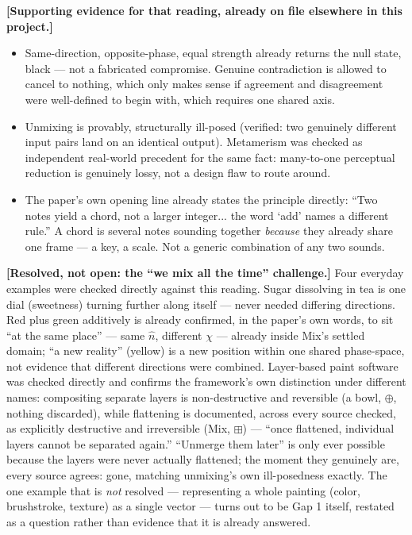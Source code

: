 \documentclass[11pt]{article}
\begin{document}
\textbf{[Supporting evidence for that reading, already on file
elsewhere in this project.]}
\begin{itemize}
\item Same-direction, opposite-phase, equal strength already returns
      the null state, black --- not a fabricated compromise.
      Genuine contradiction is allowed to cancel to nothing, which
      only makes sense if agreement and disagreement were
      well-defined to begin with, which requires one shared axis.
\item Unmixing is provably, structurally ill-posed (verified: two
      genuinely different input pairs land on an identical output).
      Metamerism was checked as independent real-world precedent for
      the same fact: many-to-one perceptual reduction is genuinely
      lossy, not a design flaw to route around.
\item The paper's own opening line already states the principle
      directly: ``Two notes yield a chord, not a larger integer... the
      word `add' names a different rule.'' A chord is several notes
      sounding together \emph{because} they already share one frame
      --- a key, a scale. Not a generic combination of any two
      sounds.
\end{itemize}

\textbf{[Resolved, not open: the ``we mix all the time'' challenge.]}
Four everyday examples were checked directly against this reading.
Sugar dissolving in tea is one dial (sweetness) turning further along
itself --- never needed differing directions. Red plus green
additively is already confirmed, in the paper's own words, to sit
``at the same place'' --- same $\hat n$, different $\chi$ --- already
inside Mix's settled domain; ``a new reality'' (yellow) is a new
position within one shared phase-space, not evidence that different
directions were combined. Layer-based paint software was checked
directly and confirms the framework's own distinction under different
names: compositing separate layers is non-destructive and reversible
(a bowl, $\oplus$, nothing discarded), while flattening is
documented, across every source checked, as explicitly destructive
and irreversible (Mix, $\boxplus$) --- ``once flattened, individual
layers cannot be separated again.'' ``Unmerge them later'' is only
ever possible because the layers were never actually flattened; the
moment they genuinely are, every source agrees: gone, matching
unmixing's own ill-posedness exactly. The one example that is
\emph{not} resolved --- representing a whole painting (color,
brushstroke, texture) as a single vector --- turns out to be Gap 1
itself, restated as a question rather than evidence that it is
already answered.
\end{document}
